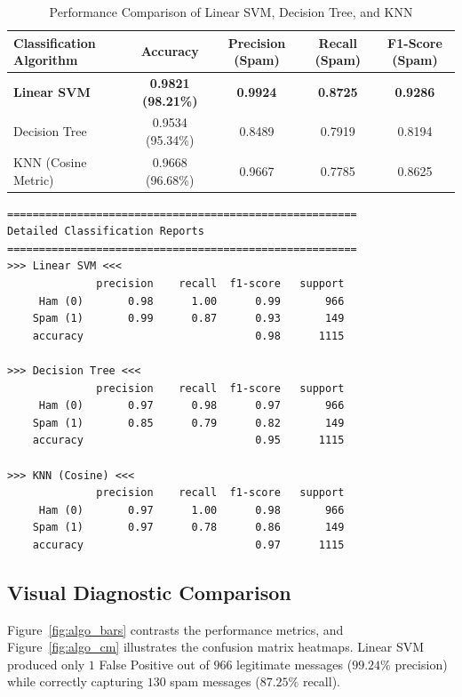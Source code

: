 \documentclass[12pt]{article}
\begin{document}
\begin{table}[H]
\centering
\caption{Performance Comparison of Linear SVM, Decision Tree, and KNN}
\label{tab:algo_results}
\vspace{0.2cm}
\begin{tabular}{lcccc}
\toprule
\textbf{Classification Algorithm} & \textbf{Accuracy} & \textbf{Precision (Spam)} & \textbf{Recall (Spam)} & \textbf{F1-Score (Spam)} \\
\midrule
\textbf{Linear SVM}  & \textbf{0.9821 (98.21\%)} & \textbf{0.9924} & \textbf{0.8725} & \textbf{0.9286} \\
Decision Tree        & 0.9534 (95.34\%)          & 0.8489          & 0.7919          & 0.8194          \\
KNN (Cosine Metric)  & 0.9668 (96.68\%)          & 0.9667          & 0.7785          & 0.8625          \\
\bottomrule
\end{tabular}
\end{table}

\begin{lstlisting}[style=output]
=======================================================
Detailed Classification Reports
=======================================================
>>> Linear SVM <<<
              precision    recall  f1-score   support
     Ham (0)       0.98      1.00      0.99       966
    Spam (1)       0.99      0.87      0.93       149
    accuracy                           0.98      1115

>>> Decision Tree <<<
              precision    recall  f1-score   support
     Ham (0)       0.97      0.98      0.97       966
    Spam (1)       0.85      0.79      0.82       149
    accuracy                           0.95      1115

>>> KNN (Cosine) <<<
              precision    recall  f1-score   support
     Ham (0)       0.97      1.00      0.98       966
    Spam (1)       0.97      0.78      0.86       149
    accuracy                           0.97      1115
\end{lstlisting}

\subsection{Visual Diagnostic Comparison}
Figure~\ref{fig:algo_bars} contrasts the performance metrics, and Figure~\ref{fig:algo_cm} illustrates the confusion matrix heatmaps. Linear SVM produced only $1$ False Positive out of $966$ legitimate messages ($99.24\%$ precision) while correctly capturing $130$ spam messages ($87.25\%$ recall).
\end{document}
